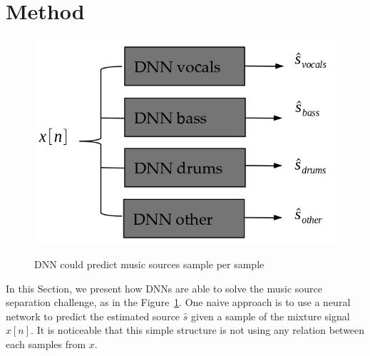 \section{Method}
\label{sec:background}


%

\begin{figure}
  \centering
  \includegraphics[width=0.5\columnwidth]{mss-basic.png}
  \label{fig:mss-basic}
  \caption{DNN could predict music sources sample per sample}
\end{figure}

In this Section, we present how DNNs are able to solve the music source separation challenge, as in the Figure~\ref{fig:mss-basic}. One naive approach is to use a neural network to predict the estimated source $\hat{s}$ given a sample of the mixture signal $x[n]$. It is noticeable that this simple structure is not using any relation between each samples from $x$. 

